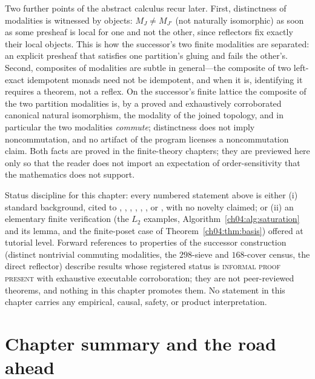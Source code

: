 \begin{remark}
\label{ch04:rem:distinctness}
Two further points of the abstract calculus recur later. First, distinctness
of modalities is witnessed by objects: $M_J\ne M_{J'}$ (not naturally
isomorphic) as soon as some presheaf is local for one and not the other, since
reflectors fix exactly their local objects. This is how the successor's two
finite modalities are separated: an explicit presheaf that satisfies one
partition's gluing and fails the other's. Second, composites of modalities
are subtle in general---the composite of two left-exact idempotent monads
need not be idempotent, and when it is, identifying it requires a theorem,
not a reflex. On the successor's finite lattice the composite of the two
partition modalities is, by a proved and exhaustively corroborated canonical
natural isomorphism, the modality of the joined topology, and in particular
the two modalities \emph{commute}; distinctness does not imply
noncommutation, and no artifact of the program licenses a noncommutation
claim. Both facts are proved in the finite-theory chapters; they are
previewed here only so that the reader does not import an expectation of
order-sensitivity that the mathematics does not support.
\end{remark}

\begin{boundary}\label{ch04:bnd:status}
Status discipline for this chapter: every numbered statement above is either
(i) standard background, cited to \cite{maclane}, \cite{maclanecwm},
\cite{johnstone}, \cite{stacks00W1}, \cite{stacks00ZC}, \cite{riehl}, or
\cite{awodey}, with no novelty claimed; or (ii) an elementary finite
verification (the $L_2$ examples, Algorithm~\ref{ch04:alg:saturation} and its
lemma, and the finite-poset case of Theorem~\ref{ch04:thm:basis}) offered at
tutorial level. Forward references to properties of the successor
construction (distinct nontrivial commuting modalities, the $298$-sieve and
$168$-cover census, the direct reflector) describe results whose registered
status is \textsc{informal proof present} with exhaustive executable
corroboration; they are not peer-reviewed theorems, and nothing in this
chapter promotes them. No statement in this chapter carries any empirical,
causal, safety, or product interpretation.
\end{boundary}

\section{Chapter summary and the road ahead}\label{ch04:sec:summary}

